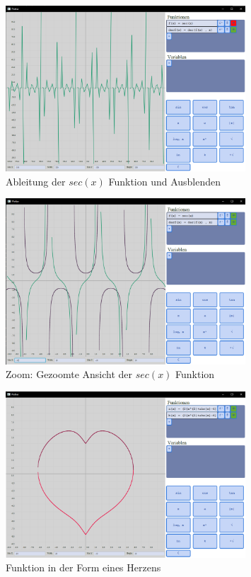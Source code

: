 \documentclass[a4paper]{article}
\begin{document}
\begin{figure}[ht]
	\centering
	\includegraphics[width=0.8\textwidth]{Resources/anwendung.png}
	\caption{Ableitung der $sec(x)$ Funktion und Ausblenden}
	\label{fig:anwendung}
\end{figure}

\begin{figure}[ht]
	\centering
	\includegraphics[width=0.8\textwidth]{Resources/zoom.png}
	\caption{Zoom: Gezoomte Ansicht der $sec(x)$ Funktion}
	\label{fig:zoom}
\end{figure}

\begin{figure}[ht]
	\centering
	\includegraphics[width=0.8\textwidth]{Resources/heartshape.png}
	\caption{Funktion in der Form eines Herzens}
	\label{fig:heart}
\end{figure}
\end{document}
